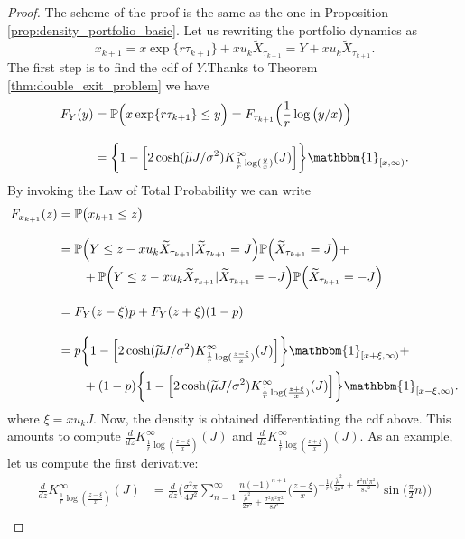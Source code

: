 \begin{proof}
	The scheme of the proof is the same as the one in Proposition \ref{prop:density_portfolio_basic}. Let us rewriting the portfolio dynamics as 
	\[ x_{k+1}=x\exp\{r\tau_{k+1}\}+xu_k\widetilde{X}_{\tau_{k+1}}=Y+xu_k\widetilde{X}_{\tau_{k+1}}. \]
	The first step is to find the cdf of $Y$.Thanks to Theorem \ref{thm:double_exit_problem} we have
	\begin{align*}
	F_Y(y) & =\mathbb{P}\Big(x\exp\{r\tau_{k+1}\}\leq y\Big)= F_{\tau_{k+1}}\Big(\frac{1}{r}\log\big(y/x\big)\Big) \\[2ex]
	& = \bigg\{ 1-\Big[2\cosh(\widetilde{\mu}J/\sigma^2)K_{\frac{1}{r}\log(\frac{y}{x})}^{\infty}(J)  \Big]\bigg\}\mathbbm{1}_{[x,\infty)}.
	\end{align*}
	By invoking the Law of Total Probability we can write
	\begin{align*}
	F_{x_{k+1}}(z) & = \mathbb{P}\big(x_{k+1}\leq z\big) \\[2ex]
	& = \mathbb{P}\Big(Y\leq z-xu_k\widetilde{X}_{\tau_{k+1}}\lvert\widetilde{X}_{\tau_{k+1}}=J\Big)\mathbb{P}\Big(\widetilde{X}_{\tau_{k+1}}=J\Big)+\\
	&\qquad + 
	\mathbb{P}\Big(Y\leq z-xu_k\widetilde{X}_{\tau_{k+1}}\lvert\widetilde{X}_{\tau_{k+1}}=-J\Big)\mathbb{P}\Big(\widetilde{X}_{\tau_{k+1}}=-J\Big)\\[2ex]
	& = F_Y(z-\xi)p + F_Y(z+\xi)(1-p)\\[2ex]
	& = p\bigg\{ 1-\Big[2\cosh(\widetilde{\mu}J/\sigma^2)K_{\frac{1}{r}\log(\frac{z-\xi}{x})}^{\infty}(J)\Big]\bigg\}\mathbbm{1}_{[x+\xi,\infty)}+\\
	& \qquad + (1-p)\bigg\{ 1-\Big[2\cosh(\widetilde{\mu}J/\sigma^2)K_{\frac{1}{r}\log(\frac{z+\xi}{x})}^{\infty}(J)\Big]\bigg\}\mathbbm{1}_{[x-\xi,\infty)}.
	\end{align*}
	where $\xi = xu_kJ$. Now, the density is obtained differentiating the cdf above. This amounts to compute $\frac{d}{dz}K_{\frac{1}{r}\log(\frac{z-\xi}{x})}^{\infty}(J)$ and $\frac{d}{dz}K_{\frac{1}{r}\log(\frac{z+\xi}{x})}^{\infty}(J)$. As an example, let us compute the first derivative:
	\begin{align*}
	\frac{d}{dz}K_{\frac{1}{r}\log(\frac{z-\xi}{x})}^{\infty}(J) & = \frac{d}{dz}\bigg(\frac{\sigma^2\pi}{4J^2}\sum_{n=1}^{\infty}\frac{n(-1)^{n+1}}{\frac{\tilde{\mu}^2}{2\sigma^2} + \frac{\sigma^2n^2\pi^2}{8J^2}}\Big(\frac{z-\xi}{x}\Big)^{-\frac{1}{r}\big(\frac{\tilde{\mu}^2}{2\sigma^2} + \frac{\sigma^2n^2\pi^2}{8J^2}\big)}\sin\big(\frac{\pi}{2}n\big)  \bigg)\\[2ex]

\end{align*}
\end{proof}
